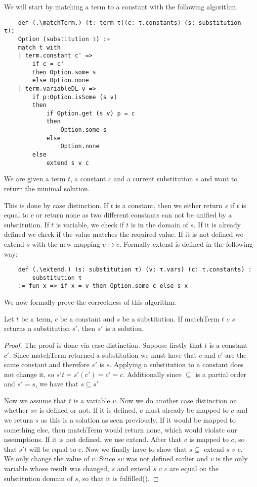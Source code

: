 We will start by matching a term to a constant with the following algorithm.

\begin{lstlisting}
    def (.\matchTerm.) (t: term τ)(c: τ.constants) (s: substitution τ):
    Option (substitution τ) :=
    match t with
    | term.constant c' =>
        if c = c'
        then Option.some s
        else Option.none
    | term.variableDL v =>
        if p:Option.isSome (s v)
        then  
            if Option.get (s v) p = c
            then
                Option.some s
            else
                Option.none
        else
            extend s v c
\end{lstlisting}

We are given a term $t$, a constant $c$ and a current substitution $s$ and want to return the minimal solution.

This is done by case distinction. If $t$ is a constant, then we either return $s$ if $t$ is equal to $c$ or return none as two different constants can not be unified by a substitution. If $t$ is variable, we check if $t$ is in the domain of $s$. If it is already defined we check if the value matches the required value. If it is not defined we extend $s$ with the new mapping $v \mapsto c$.
Formally extend is defined in the following way:

\begin{lstlisting}
    def (.\extend.) (s: substitution τ) (v: τ.vars) (c: τ.constants) :
        substitution τ 
    := fun x => if x = v then Option.some c else s x
\end{lstlisting}

We now formally prove the correctness of this algorithm. 

\begin{lemma}[\matchTermFindsSolution]
    Let $t$ be a term, $c$ be a constant and $s$ be a substitution. If matchTerm $t$ $c$ $s$ returns a substitution $s'$, then $s'$ is a solution.
\end{lemma}
\begin{proof}
The proof is done via case distinction. Suppose firstly that $t$ is a constant $c'$. Since matchTerm returned a substitution we must have that $c$ and $c'$ are the same constant and therefore $s'$ is $s$. Applying a substitution to a constant does not change it, so $s' t = s' (c') = c' = c$. Additionally since $\subseteq$ is a partial order and $s' = s$, we have that $s \subseteq s'$

Now we assume that $t$ is a variable $v$. Now we do another case distinction on whether $s v$ is defined or not. If it is defined, $v$ must already be mapped to $c$ and we return $s$ as this is a solution as seen previously. If it would be mapped to something else, then matchTerm would return none, which would violate our assumptions.
If it is not defined, we use extend. After that $v$ is mapped to $c$, so that $s' t$ will be equal to $c$. Now we finally have to show that $s \subseteq$ extend $s$ $v$ $c$. We only change the value of $v$. Since $s v$ was not defined earlier and $v$ is the only variable whose result was changed, $s$ and extend $s$ $v$ $c$ are equal on the substitution domain of $s$, so that it is fulfilled(\ssubsetextends).
\end{proof}

